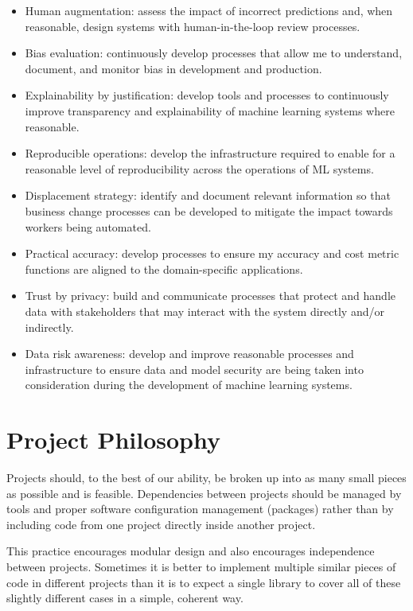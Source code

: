 \documentclass[
  11pt,
]{book}
\begin{document}
\begin{itemize}
\item
  Human augmentation: assess the impact of incorrect predictions and, when reasonable, design systems with human-in-the-loop review processes.
\item
  Bias evaluation: continuously develop processes that allow me to understand, document, and monitor bias in development and production.
\item
  Explainability by justification: develop tools and processes to continuously improve transparency and explainability of machine learning systems where reasonable.
\item
  Reproducible operations: develop the infrastructure required to enable for a reasonable level of reproducibility across the operations of ML systems.
\item
  Displacement strategy: identify and document relevant information so that business change processes can be developed to mitigate the impact towards workers being automated.
\item
  Practical accuracy: develop processes to ensure my accuracy and cost metric functions are aligned to the domain-specific applications.
\item
  Trust by privacy: build and communicate processes that protect and handle data with stakeholders that may interact with the system directly and/or indirectly.
\item
  Data risk awareness: develop and improve reasonable processes and infrastructure to ensure data and model security are being taken into consideration during the development of machine learning systems.
\end{itemize}

\hypertarget{project-philosophy}{%
\chapter{Project Philosophy}\label{project-philosophy}}

Projects should, to the best of our ability, be broken up into as many small pieces as possible and is feasible. Dependencies between projects should be managed by tools and proper software configuration management (packages) rather than by including code from one project directly inside another project.

This practice encourages modular design and also encourages independence between projects. Sometimes it is better to implement multiple similar pieces of code in different projects than it is to expect a single library to cover all of these slightly different cases in a simple, coherent way.
\end{document}
